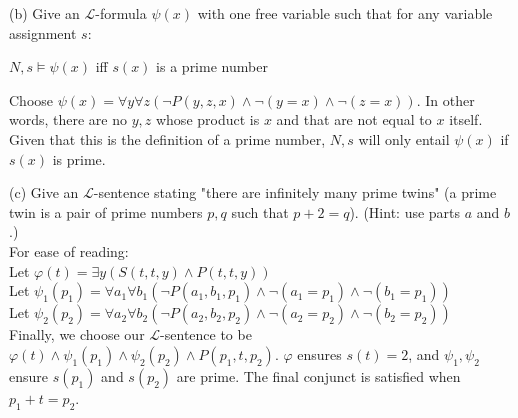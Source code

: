 \documentclass[11pt]{article}
\begin{document}
\noindent
(b) Give an $\mathcal{L}$-formula $\psi(x)$ with one free variable such that for any variable assignment $s$:
\begin{center}
    $N,s \models \psi(x)$ iff $s(x)$ is a prime number
\end{center}
\color{RoyalBlue}
Choose $\psi(x) = \forall y \forall z (\neg P(y, z, x) \wedge \neg(y=x) \wedge \neg(z=x))$. In other words, there are no $y,z$ whose product is $x$ and that are not equal to $x$ itself. Given that this is the definition of a prime number, $N,s$ will only entail $\psi(x)$ if $s(x)$ is prime. \\
\color{Black}

\noindent
(c) Give an $\mathcal{L}$-sentence stating "there are infinitely many prime twins" (a prime twin is a pair of prime numbers $p,q$ such that $p+2=q$). (Hint: use parts $a$ and $b$.) \\

\color{RoyalBlue}
\noindent
For ease of reading: \\
Let $\varphi(t) = \exists y (S(t,t,y) \wedge P(t,t,y))$ \\
Let $\psi_1(p_1) = \forall a_1 \forall b_1 (\neg P(a_1,b_1,p_1) \wedge \neg (a_1=p_1) \wedge \neg (b_1=p_1))$ \\
Let $\psi_2(p_2) = \forall a_2 \forall b_2 (\neg P(a_2,b_2,p_2) \wedge \neg (a_2=p_2) \wedge \neg (b_2=p_2))$ \\
\noindent
Finally, we choose our $\mathcal{L}$-sentence to be $\varphi(t) \wedge \psi_1(p_1) \wedge \psi_2(p_2) \wedge P(p_1, t, p_2)$. $\varphi$ ensures $s(t)=2$, and $\psi_1,\psi_2$ ensure $s(p_1)$ and $s(p_2)$ are prime. The final conjunct is satisfied when $p_1+t=p_2$.
\color{Black}
\end{document}
